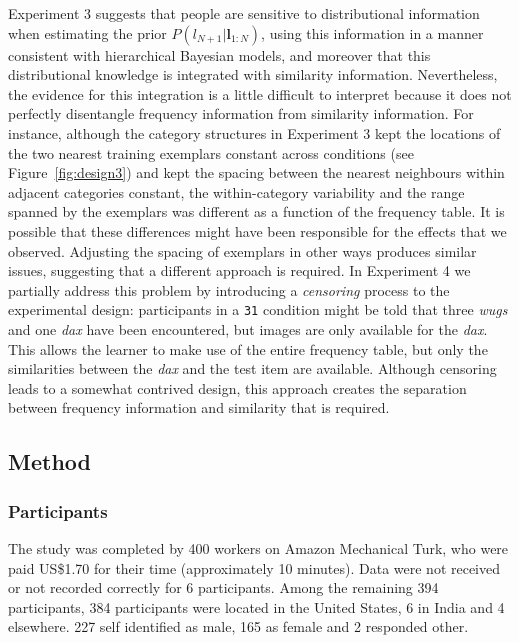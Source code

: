 \documentclass[doc]{apa6}
\newcommand{\dist}[1]{\texttt{#1}}
\begin{document}
Experiment 3 suggests that people are sensitive to distributional information when estimating the prior $P(l_{N+1} | \bm{l}_{1:N})$, using this information in a manner consistent with hierarchical Bayesian models, and moreover that this distributional knowledge is integrated with similarity information. Nevertheless, the evidence for this integration is a little difficult to interpret because it does not perfectly disentangle frequency information from similarity information. For instance, although the category structures in Experiment 3 kept the locations of the two nearest training exemplars constant across conditions (see Figure~\ref{fig:design3}) and kept the spacing between the nearest neighbours within adjacent categories constant, the within-category variability and the range spanned by the exemplars was different as a function of the frequency table. It is possible that these differences might have been responsible for the effects that we observed. Adjusting the spacing of exemplars in other ways produces similar issues, suggesting that a different approach is required. In Experiment 4 we partially address this problem by introducing a {\it censoring} process to the experimental design: participants in a \dist{31} condition might be told that three {\it wugs} and one {\it dax} have been encountered, but images are only available for the {\it dax}. This allows the learner to make use of the entire frequency table, but only the similarities between the {\it dax} and the test item are available. Although censoring leads to a somewhat contrived design, this approach creates the separation between frequency information and similarity that is required.

\subsection{Method}

\subsubsection{Participants} The study was completed by 400 workers on Amazon Mechanical Turk, who were paid US\$1.70 for their time (approximately 10 minutes). Data were not received or not recorded correctly for 6 participants. Among the remaining 394 participants, 384 participants were located in the United States, 6 in India and 4 elsewhere. 227 self identified as male, 165 as female and 2 responded other.
\end{document}
